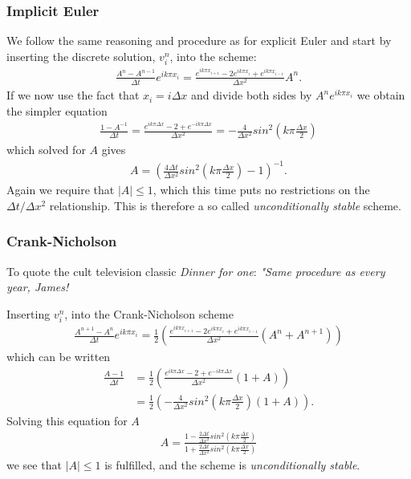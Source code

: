 \documentclass[11pt,a4paper,draft]{article}
\numberwithin{equation}{section}
\begin{document}
\subsubsection{Implicit Euler}
We follow the same reasoning and procedure as for explicit Euler and start by inserting the discrete solution, $v^n_i$, into the scheme:
\begin{align*}
\frac{A^{n}-A^{n-1}}{\Delta t} e^{ik \pi x_i} = \frac{e^{ik \pi x_{i+1}} -2e^{ik \pi x_i} + e^{ik \pi x_{i-1}}}{\Delta x^2} A^n.
\end{align*}
If we now use the fact that $x_i = i\Delta x$ and divide both sides by $A^n e^{ik \pi x_i}$ we obtain the simpler equation
\begin{align*}
\frac{1-A^{-1}}{\Delta t} = \frac{e^{ik \pi \Delta x} -2 + e^{-ik \pi \Delta x}}{\Delta x^2} = -\frac{4}{\Delta x^2}sin^2\left(k\pi \frac{\Delta x}{2}\right)
\end{align*}
which solved for $A$ gives
\begin{align*}
A=\left( \frac{4\Delta t}{\Delta x^2}sin^2\left(k\pi \frac{\Delta x}{2}\right)-1 \right)^{-1}.
\end{align*}
Again we require that $|A| \leq 1$, which this time puts no restrictions on the $\Delta t/ \Delta x^2$ relationship. This is therefore a so called \emph{unconditionally stable} scheme.


\subsubsection{Crank-Nicholson}
To quote the cult television classic \emph{Dinner for one}:  \emph{"Same procedure as every year, James!}

Inserting  $v^n_i$, into the Crank-Nicholson scheme
\begin{align*}
\frac{A^{n+1} - A^{n}}{\Delta t} e^{ik \pi x_i} = \frac{1}{2} \left( \frac{e^{ik \pi x_{i+1}}-2e^{ik \pi x_{i}} + e^{ik \pi x_{i-1}}}{\Delta x^2} (A^n + A^{n+1})  \right)
\end{align*}
which can be written 
\begin{align*}
\frac{A-1}{\Delta t} &= \frac{1}{2} \left( \frac{e^{ik \pi \Delta x} -2 + e^{-ik \pi \Delta x}}{\Delta x^2} (1 + A) \right) \\
&= \frac{1}{2} \left( -\frac{4}{\Delta x^2}sin^2\left(k\pi \frac{\Delta x}{2}\right)(1 + A) \right).
\end{align*}
Solving this equation for $A$
\begin{align*}
A = \frac{1-\frac{2\Delta t}{\Delta x^2}sin^2\left(k\pi \frac{\Delta x}{2}\right)}{1+\frac{2\Delta t}{\Delta x^2}sin^2\left(k\pi \frac{\Delta x}{2}\right)}
\end{align*}
we see that $|A| \leq 1$ is fulfilled, and the scheme is  \emph{unconditionally stable}.
\end{document}

